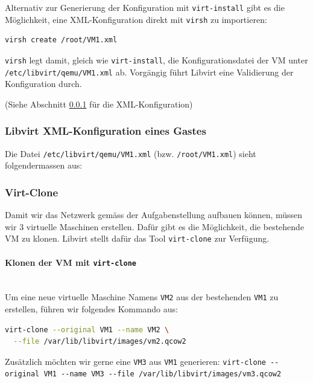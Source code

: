 Alternativ zur Generierung der Konfiguration mit \lstinline|virt-install| gibt es die Möglichkeit, eine XML-Konfiguration  direkt mit \lstinline|virsh| zu importieren:

\begin{lstlisting}
virsh create /root/VM1.xml
\end{lstlisting}

\lstinline|virsh| legt damit, gleich wie \lstinline|virt-install|, die Konfigurationsdatei der VM unter \lstinline|/etc/libvirt/qemu/VM1.xml| ab. Vorgängig führt Libvirt eine Validierung der Konfiguration durch.

(Siehe Abschnitt \ref{sec:libvirt-xml-konfiguration-eines-gastes} für die XML-Konfiguration)

\subsubsection{Libvirt XML-Konfiguration eines Gastes}\label{sec:libvirt-xml-konfiguration-eines-gastes}

Die Datei \lstinline|/etc/libvirt/qemu/VM1.xml| (bzw. \lstinline|/root/VM1.xml|) sieht folgendermassen aus:


\subsubsection{Virt-Clone}
Damit wir das Netzwerk gemäss der Aufgabenstellung aufbauen können, müssen wir 3 virtuelle Maschinen erstellen. Dafür gibt es die Möglichkeit, die bestehende VM zu klonen. Libvirt stellt dafür das Tool \lstinline|virt-clone| zur Verfügung.

\paragraph{Klonen der VM mit \lstinline|virt-clone|} \hfill \\

Um eine neue virtuelle Maschine Namens \lstinline|VM2| aus der bestehenden \lstinline|VM1| zu erstellen, führen wir folgendes Kommando aus:

\begin{lstlisting}[language=bash]
virt-clone --original VM1 --name VM2 \
  --file /var/lib/libvirt/images/vm2.qcow2
\end{lstlisting}

Zusätzlich möchten wir gerne eine \lstinline|VM3| aus \lstinline|VM1| generieren: \lstinline|virt-clone --original VM1 --name VM3 --file /var/lib/libvirt/images/vm3.qcow2|

